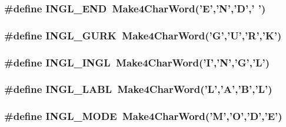 \hypertarget{a00216_ad5619d334209fd6165d613fb7fc3891f}{
\subsubsection[{I\-N\-G\-L\-\_\-\-E\-N\-D}]{\setlength{\rightskip}{0pt plus 5cm}\#define I\-N\-G\-L\-\_\-\-E\-N\-D~{\bf Make4\-Char\-Word}('E','N','D',' ')}}\label{a00216_ad5619d334209fd6165d613fb7fc3891f}
\hypertarget{a00216_a7dcd3f55b97ae935548b73a30ccce597}{
\subsubsection[{I\-N\-G\-L\-\_\-\-G\-U\-R\-K}]{\setlength{\rightskip}{0pt plus 5cm}\#define I\-N\-G\-L\-\_\-\-G\-U\-R\-K~{\bf Make4\-Char\-Word}('G','U','R','K')}}\label{a00216_a7dcd3f55b97ae935548b73a30ccce597}
\hypertarget{a00216_a1656cd5348fc3cbd6c63c1394251cdba}{
\subsubsection[{I\-N\-G\-L\-\_\-\-I\-N\-G\-L}]{\setlength{\rightskip}{0pt plus 5cm}\#define I\-N\-G\-L\-\_\-\-I\-N\-G\-L~{\bf Make4\-Char\-Word}('I','N','G','L')}}\label{a00216_a1656cd5348fc3cbd6c63c1394251cdba}
\hypertarget{a00216_a36200655cee893833b5cd03264d75d62}{
\subsubsection[{I\-N\-G\-L\-\_\-\-L\-A\-B\-L}]{\setlength{\rightskip}{0pt plus 5cm}\#define I\-N\-G\-L\-\_\-\-L\-A\-B\-L~{\bf Make4\-Char\-Word}('L','A','B','L')}}\label{a00216_a36200655cee893833b5cd03264d75d62}
\hypertarget{a00216_a9542c65c4ca321f7e53587b67721b042}{
\subsubsection[{I\-N\-G\-L\-\_\-\-M\-O\-D\-E}]{\setlength{\rightskip}{0pt plus 5cm}\#define I\-N\-G\-L\-\_\-\-M\-O\-D\-E~{\bf Make4\-Char\-Word}('M','O','D','E')}}\label{a00216_a9542c65c4ca321f7e53587b67721b042}

